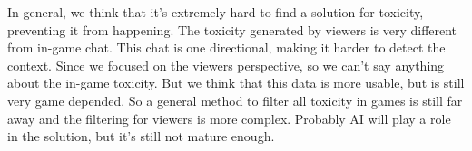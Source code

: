 \documentclass[final]{report}
\begin{document}
In general, we think that it's extremely hard to find a solution for toxicity, preventing it from happening. The toxicity generated by viewers is very different from in-game chat. This chat is one directional, making it harder to detect the context. Since we focused on the viewers perspective, so we can't say anything about the in-game toxicity. But we think that this data is more usable, but is still very game depended. So a general method to filter all toxicity in games is still far away and the filtering for viewers is more complex. Probably AI will play a role in the solution, but it's still not mature enough.
\end{document}
